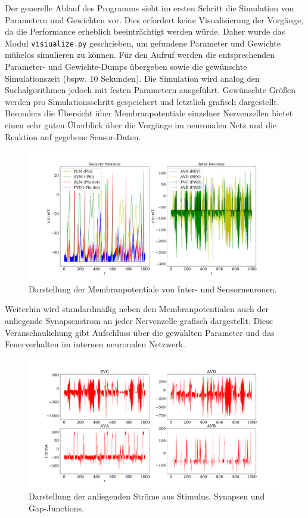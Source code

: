 	Der generelle Ablauf des Programms sieht im ersten Schritt die Simulation von Parametern und Gewichten vor. Dies erfordert keine Visualisierung der Vorgänge, da die Performance erheblich beeinträchtigt werden würde. Daher wurde das Modul \texttt{visiualize.py} geschrieben, um gefundene Parameter und Gewichte mühelos simulieren zu können. Für den Aufruf werden die entsprechenden Parameter- und Gewichte-Dumps übergeben sowie die gewünschte Simulationszeit (bspw. 10 Sekunden). Die Simulation wird analog den Suchalgorithmen jedoch mit festen Parametern ausgeführt. Gewünschte Größen werden pro Simulationsschritt gespeichert und letztlich grafisch dargestellt. Besonders die Übersicht über Membranpotentiale einzelner Nervenzellen bietet einen sehr guten Überblick über die Vorgänge im neuronalen Netz und die Reaktion auf gegebene Sensor-Daten.
	\begin{figure}[H] %
		\centering
		\includegraphics[width=15cm]{figures/chap_implement/plot_membranpot_1.pdf}
		\caption{Darstellung der Membranpotentiale von Inter- und Sensorneuronen.}
		\label{fig:plot_membr}
	\end{figure}
	Weiterhin wird standardmäßig neben den Membranpotentialen auch der anliegende Synapsenstrom an jeder Nervenzelle grafisch dargestellt. Diese Veranschaulichung gibt Aufschluss über die gewählten Parameter und das Feuerverhalten im internen neuronalen Netzwerk.
	\begin{figure}[H] %
		\centering
		\includegraphics[width=15cm]{figures/chap_implement/plot_synstrom_1.pdf}
		\caption{Darstellung der anliegenden Ströme aus Stimulus, Synapsen und Gap-Junctions.}
		\label{fig:plot_synstrom}
	\end{figure}

